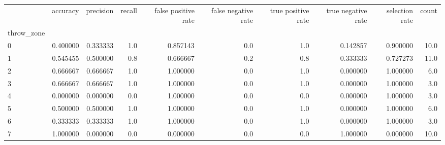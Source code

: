 \begin{tabular}{lrrrrrrrrr}
\toprule
{} &  accuracy &  precision &  recall &  false positive rate &  false negative rate &  true positive rate &  true negative rate &  selection rate &  count \\
throw\_zone &           &            &         &                      &                      &                     &                     &                 &        \\
\midrule
0          &  0.400000 &   0.333333 &     1.0 &             0.857143 &                  0.0 &                 1.0 &            0.142857 &        0.900000 &   10.0 \\
1          &  0.545455 &   0.500000 &     0.8 &             0.666667 &                  0.2 &                 0.8 &            0.333333 &        0.727273 &   11.0 \\
2          &  0.666667 &   0.666667 &     1.0 &             1.000000 &                  0.0 &                 1.0 &            0.000000 &        1.000000 &    6.0 \\
3          &  0.666667 &   0.666667 &     1.0 &             1.000000 &                  0.0 &                 1.0 &            0.000000 &        1.000000 &    3.0 \\
4          &  0.000000 &   0.000000 &     0.0 &             1.000000 &                  0.0 &                 0.0 &            0.000000 &        1.000000 &    3.0 \\
5          &  0.500000 &   0.500000 &     1.0 &             1.000000 &                  0.0 &                 1.0 &            0.000000 &        1.000000 &    6.0 \\
6          &  0.333333 &   0.333333 &     1.0 &             1.000000 &                  0.0 &                 1.0 &            0.000000 &        1.000000 &    3.0 \\
7          &  1.000000 &   0.000000 &     0.0 &             0.000000 &                  0.0 &                 0.0 &            1.000000 &        0.000000 &   10.0 \\
\bottomrule
\end{tabular}
